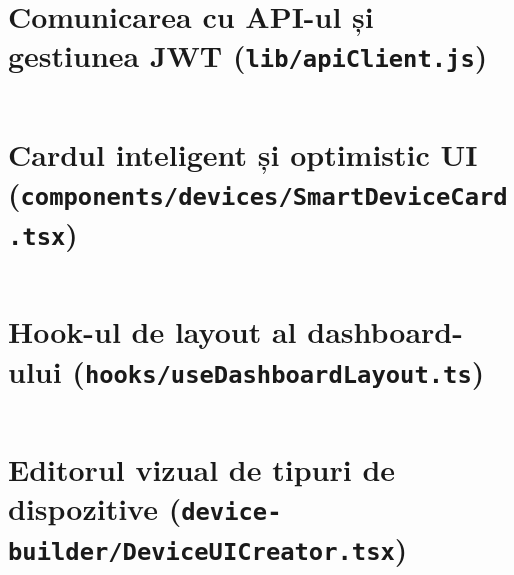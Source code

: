 \section{Comunicarea cu API-ul și gestiunea JWT (\texttt{lib/\allowbreak apiClient.js})}
\label{anexa:apiclient}
\inputminted{javascript}{cod/apiClient.js}

\section{Cardul inteligent și optimistic UI (\texttt{components/\allowbreak devices/\allowbreak SmartDeviceCard.tsx})}
\label{anexa:smartdevicecard}
\inputminted{typescript}{cod/SmartDeviceCard.tsx}

\section{Hook-ul de layout al dashboard-ului (\texttt{hooks/\allowbreak useDashboardLayout.ts})}
\label{anexa:dashboardlayout}
\inputminted{typescript}{cod/useDashboardLayout.ts}

\section{Editorul vizual de tipuri de dispozitive (\texttt{device-builder/\allowbreak DeviceUICreator.tsx})}
\label{anexa:deviceuicreator}
\inputminted{typescript}{cod/DeviceUICreator.tsx}
